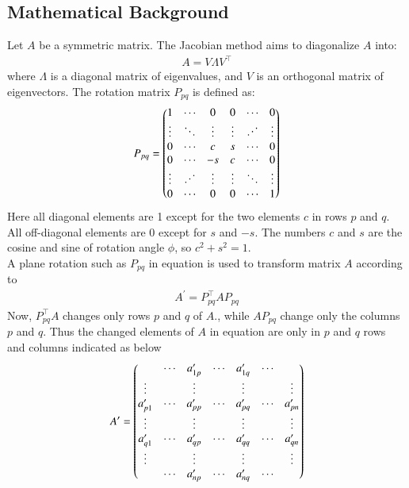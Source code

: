 \documentclass[a4paper,12pt]{article}
\theoremstyle{remark}
\begin{document}
\subsection{Mathematical Background}
Let $A$ be a symmetric matrix. The Jacobian method aims to diagonalize $A$ into:
\begin{align}
A = V \Lambda V^\top
\end{align}
where $\Lambda$ is a diagonal matrix of eigenvalues, and $V$ is an orthogonal matrix of eigenvectors.
The rotation matrix $P_{pq}$ is defined as:
\begin{align}
P_{pq} = \myvec{
1 & \cdots & 0 & 0 & \cdots & 0 \\
\vdots & \ddots & \vdots & \vdots & \reflectbox{$\ddots$} & \vdots \\
0 & \cdots & c & s & \cdots & 0\\
0 & \cdots & -s & c & \cdots & 0\\
\vdots & \reflectbox{$\ddots$} & \vdots & \vdots & \ddots & \vdots\\
0 & \cdots & 0 & 0 & \cdots & 1
}
\end{align}
Here all diagonal elements are 1 except for the two elements $c$ in rows  $p$ and $q$. All off-diagonal elements are 0 except for $s$ and $-s$. The numbers $c$ and $s$ are the cosine and sine of rotation angle $\phi$, so $c^2+s^2=1$.\\
A plane rotation such as $P_{pq}$ in equation  is used to transform matrix $A$ according to
\begin{align}
	A^\prime = P_{pq}^\top A P_{pq}
\end{align} 
Now, $P_{pq}^\top A$ changes only rows $p$ and $q$ of $A$., while $AP_{pq}$ change only the columns $p$ and $q$. Thus the changed elements of $A$ in equation  are only in $p$ and $q$ rows and columns indicated as below
\begin{align}
	A^\prime =\begin{pmatrix}
 & \cdots & a_{1p}^\prime & \cdots & a_{1q}^\prime & \cdots & \\
\vdots &  & \vdots & & \vdots & & \vdots \\
a_{p1}^\prime & \cdots & a_{pp}^\prime & \cdots & a_{pq}^\prime & \cdots & a_{pn}^\prime\\
\vdots & & \vdots & & \vdots & & \vdots\\
a_{q1}^\prime & \cdots & a_{qp}^\prime & \cdots & a_{qq}^\prime & \cdots & a_{qn}^\prime\\
\vdots & & \vdots & & \vdots & & \vdots \\
& \cdots & a_{np}^\prime & \cdots & a_{nq}^\prime & \cdots& \end{pmatrix}
\end{align}
\end{document}
